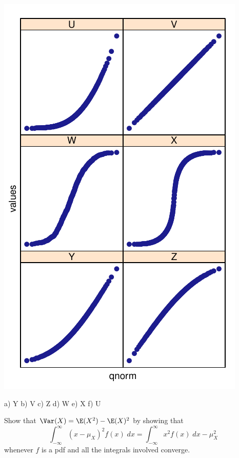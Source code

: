 \documentclass[twoside]{book}\usepackage[]{graphicx}\usepackage[]{xcolor}
\makeatletter
\def\maxwidth{ %
  \ifdim\Gin@nat@width>\linewidth
    \linewidth
  \else
    \Gin@nat@width
  \fi
}
\newenvironment{knitrout}{}{} %
\makeatother
\begin{document}
\begin{problem}
\begin{knitrout}
{\includegraphics[width=\maxwidth]{figures/fig-compareplots1-2} 

}



\end{knitrout}
\end{problem}
\begin{solution}
a) Y  b) V c) Z d) W  e) X f) U
\end{solution}

\begin{problem}
	Show that $\Var(X) = \E(X^2) - \E(X)^2$ by showing that 
	\[
	\int_{-\infty}^{\infty} (x - \mu_X) ^2 f(x) \; dx
	=
	\int_{-\infty}^{\infty} x^2 f(x) \; dx  -  \mu_X^2
	\]
	whenever $f$ is a pdf and all the integrals involved converge.
\end{problem}
\end{document}
